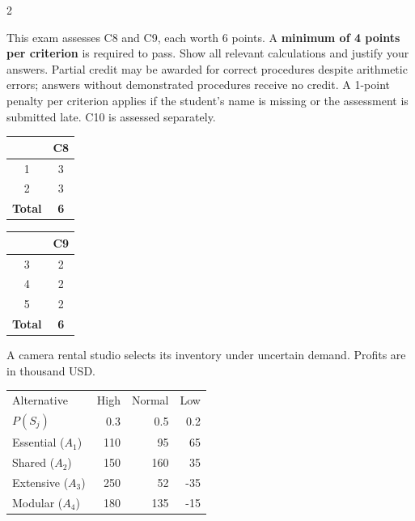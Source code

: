 	\begin{multicols}{2}
		\raggedcolumns
		
		This exam assesses C8 and C9, each worth 6 points. A \textbf{minimum of 4 points per criterion} is required to pass. Show all relevant calculations and justify your answers. Partial credit may be awarded for correct procedures despite arithmetic errors; answers without demonstrated procedures receive no credit. A 1-point penalty per criterion applies if the student's name is missing or the assessment is submitted late. C10 is assessed separately.
		
		\vspace{-7mm}
		\begin{center}
			\begin{tabular}{|c|c|}
				\hline
				\textbf{\textnumero} & \textbf{C8} \\ \hline
				1 & 3 \\ \hline
				2 & 3 \\ \hline
				\textbf{Total} & \textbf{6} \\ \hline
			\end{tabular}
			\hspace{1cm}
			\begin{tabular}{|c|c|}
				\hline
				\textbf{\textnumero} & \textbf{C9} \\ \hline
				3 & 2 \\ \hline
				4 & 2 \\ \hline
				5 & 2 \\ \hline
				\textbf{Total} & \textbf{6} \\ \hline
			\end{tabular}
		\end{center}
		\vspace{-4mm}
		
		
A camera rental studio selects its inventory under uncertain demand. Profits are in thousand USD.

\vspace{-3mm}
\begin{center}\small\setlength{\tabcolsep}{4pt}
	\begin{tabular}{lrrr}\toprule
		Alternative & High & Normal & Low\\
		$P(S_j)$ & 0.3 & 0.5 & 0.2\\ \midrule
				Essential ($A_1$) & 110 & 95 & 65\\
		Shared ($A_2$) & 150 & 160 & 35\\
		Extensive ($A_3$) & 250 & 52 & -35\\
		Modular ($A_4$) & 180 & 135 & -15\\
		\bottomrule
	\end{tabular}
\end{center} \vspace*{-3mm}


\end{multicols}

